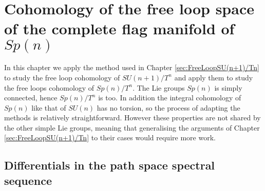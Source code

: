 \documentclass{article}
\theoremstyle{plain}
\theoremstyle{definition}
\numberwithin{thm}{section}
\begin{document}
\newpage
\section{Cohomology of the free loop space of the complete flag manifold of $Sp(n)$}\label{sec:FreeLoopSp(n)/Tn}
	
	In this chapter we apply the method used in Chapter \ref{sec:FreeLoopSU(n+1)/Tn} to study the free loop cohomology of $SU(n+1)/T^n$
	and apply them to study the free loops cohomology of $Sp(n)/T^n$.
	The Lie groups $Sp(n)$ is simply connected, hence $Sp(n)/T^n$ is too.
	In addition the integral cohomology of $Sp(n)$ like that of $SU(n)$ has no torsion,
	so the process of adapting the methods is relatively straightforward.
	However these properties are not shared by the other simple Lie groups,
	meaning that generalising the arguments of Chapter \ref{sec:FreeLoopSU(n+1)/Tn} to their cases would require more work.
	
	\subsection{Differentials in the path space spectral sequence}	
		
\end{document}
